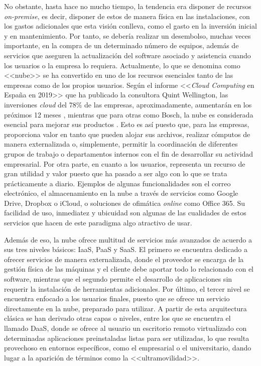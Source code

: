 \clearpage

No obstante, hasta hace no mucho tiempo, la tendencia era disponer de recursos \textit{on-premise}, es decir, disponer de estos de manera física en las instalaciones, con los gastos adicionales que esta visión conlleva, como el gasto en la inversión inicial y en mantenimiento. Por tanto, se debería realizar un desembolso, muchas veces importante, en la compra de un determinado número de equipos, además de servicios que aseguren la actualización del software asociado y asistencia cuando los usuarios o la empresa lo requiera. Actualmente, lo que se denomina como <<nube>> se ha convertido en uno de los recursos esenciales tanto de las empresas como de los propios usuarios. Según el informe <<\textit{Cloud Computing} en España en 2019>> que ha publicado la consultora Quint Wellington, las inversiones \textit{cloud} del 78\% de las empresas, aproximadamente, aumentarán en los próximos 12 meses \cite{datacentermarket2019}, mientras que para otras como Bosch, la nube es considerada esencial para mejorar sus productos \cite{worldenergytrade2019}. Esto es así puesto que, para las empresas, proporciona valor en tanto que pueden alojar sus archivos, realizar cómputos de manera externalizada o, simplemente, permitir la coordinación de diferentes grupos de trabajo o departamentos internos con el fin de desarrollar su actividad empresarial. Por otra parte, en cuanto a los usuarios, representa un recurso de gran utilidad y valor puesto que ha pasado a ser algo con lo que se trata prácticamente a diario. Ejemplos de algunas funcionalidades son el correo electrónico, el almacenamiento en la nube a través de servicios como Google Drive, Dropbox o iCloud, o soluciones de ofimática \textit{online} como Office 365. Su facilidad de uso, inmediatez y ubicuidad son algunas de las cualidades de estos servicios que hacen de este paradigma algo atractivo de usar.

Además de eso, la nube ofrece multitud de servicios más avanzados de acuerdo a sus tres niveles básicos: \acf{IaaS}, \acf{PaaS} y \acf{SaaS}. El primero se encuentra dedicado a ofrecer servicios de manera externalizada, donde el proveedor se encarga de la gestión física de las máquinas y el cliente debe aportar todo lo relacionado con el software, mientras que el segundo permite el desarrollo de aplicaciones sin requerir la instalación de herramientas adicionales. Por último, el tercer nivel se encuentra enfocado a los usuarios finales, puesto que se ofrece un servicio directamente en la nube, preparado para utilizar. A partir de esta arquitectura clásica se han derivado otras capas o niveles, entre los que se encuentra el llamado \acf{DaaS}, donde se ofrece al usuario un escritorio remoto virtualizado con determinadas aplicaciones preinstaladas listas para ser utilizadas, lo que resulta provechoso en entornos específicos, como el empresarial o el universitario, dando lugar a la aparición de términos como la <<ultramovilidad>>.


